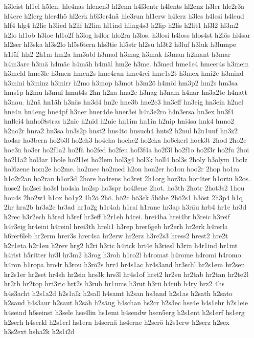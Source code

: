 {h3leist
hl1el
h5len.
hle4nas
hlenen3
hl2enn
h4l3entr
h4lents
hl2enz
h3ler
hle2r3a
hl4ere
h2lerg
hler4hö
hl2erk
h6l3er4nä
hle3run
hl1erw
h4lerz
h3les
h4lesi
h4leud
hlf4
hlg4
h2lie
h3lied
h2lif
h2lim
hl1ind
hling4s3
h2lip
h2lis
h2lit1
hl3l2
hl3m2
h2lo
hl1ob
h3loc
hl1o2f
h3log
h4lor
hlo2ra
h3los.
h3losi
h4loss
hlos4st
h2lös
hl4sar
hl2ser
hl3ska
hl3s2lo
hl5s6tern
hls3tie
hl5str
hl2su
hl3t2
h3luf
h3luk
h3lumpe
h1lüf
hlz2
2h1m
hm2a
hm3abl
h3mad
h3mag
h3mak
h3man
h2mant
h3mar
h4m3arc
h3mä
h4mäc
h4mäh
h4mäl
hm2e
h3me.
h3med
hme1e4
hmeer4s
h3mein
h3meld
hme3le
h3men
hmen2s
hme4ran
hme4rei
hme1s2t
h3mex
hmi2e
h3mind
h3mini
h3minz
h3mirr
h2mo
h3mop
h3mot
h3m2ö
h4möl
hm3p2
hm2s
hm3sa
hms1p
h2mu
h3mul
hmut4s
2hn
h2na
hna2c
h3nag
h3nam
h4nar
hn3a2te
h4natt
h3nau.
h2nä
hn1äh
h3näs
hn3d4
hn2e
hne3b
hne2e3
hn3eff
hn3eig
hn3ein
h2nel
hne4n
hn4eng
hne4pf
h3ner
hner4de
hner3ei
h4n3e2ro
h4n3ersa
hn3ex
hn3f4
hnflei4
hnhof8stras
h2nic
h2nid
h2nie
hn1im
hn1in
h2nip
hni4sa
hnk4
hnno2
h2no2r
hnra2
hn3sa
hn3s2p
hnst2
hns4to
hnsuch4
hnts2
h2nul
h2n1unf
hn3z2
ho4ar
ho3bern
ho2b3l
ho2ch3
ho4cha
hoche2
ho2cka
ho6ckerl
hock3t
2hod
2ho2e
hoe3n
ho3er
ho2f1a2
ho2fä
ho2fed
ho2feu
hof3f4a
ho2f3l
ho2f1o
ho2f3r
ho2fu
2hoi
ho2l1a2
hol3ar
1hole
ho2l1ei
ho2lem
hol3g4
hol3k
holl4
hol3s
2holy
h3olym
1holz
hol6zene
hom2e
ho2me.
ho2mec
ho2med
h2on
hon2er
ho1on
hoo2r
2hop
ho1ra
h1o2r2an
ho2rau
h1or3d
2hore
ho4rens
ho3ret
2h1org
hor3ta
hor4ter
h1ortu
h2os.
hose2
ho2sei
ho3sl
ho4sla
ho2sp
ho3spr
ho4ßene
2hot.
ho3th
2hotr
2hot3s2
1hou
hou4s
2ho2w1
h1ox
ho1y2
1h2ö
2hö.
hö2c
hö3ck
5höhe
2hö2s1
h3öst
2h3p4
h1q
2hr
hra2b
hr3a2c
hr3ad
hr1a2g
h1r4ah
h1rai
h1rane
hr3ap
h3räu
hrb4
hr1c
hr3d
h2rec
h3r2ech
h3red
h3ref
hr3eff
h2r1eh
h4rei.
hrei4ba
hrei4br
h3reic
h3reif
h4r3eig
hr4eini
h4reinl
hrei3th
hreli1
h3rep
hrer6geb
hr2erh
hr2erk
h4rerla
h6rer6leb
hr2erm
hrer3s
hrer4sa
hr2erw
hr2erz
h3re2s3
hress2
hrest2
hre2t
h2r1eta
h2r1eu
h2rev
hrg2
h2ri
h3ric
h4rick
hri4e
h3riesl
h3rin
h4r1ind
hr1int
h4rist
h5ritter
hr3l
hr3m2
h3rog
h3roh
h1ro2l
h4romat
h4rome
h4romi
h4romo
h4ron
h1ropa
hro4r
h3rou
h3rö2s
hrr4
hr4s1ac
hr4s3and
hr3schl
hr2s1em
hr2sen
hr2s1er
hr2set
hr4sh
hr2sin
hrs3k
hrs3l
hr4s1of
hrst2
hr2su
hr2tab
hr2tan
hr2te2l
hr2th
hr2top
hrt3ric
hrt2s
h3ruh
hr1ums
h3rut
h3rü
h4rüb
h4ry
hrz2
4hs
h4s3acht
h2s1a2d
h2s1alk
h2sall
h4samt
h2san
hs3and
h2s1as
h2sath
h2sato
h2saud
h4s3aur
h2saut
h2säh
h2säug
h4schan
hs2cr
h2s3ec
hse4e
h4s1ehr
h2s1eie
h4seind
h6seinst
h3sele
hse4lin
hs1emi
h4sendw
hsen5erg
h2s1ent
h2s1erf
hs1erg
h2serh
h4serkl
h2s1erl
hs1ern
h4sernä
hs4erne
h2serö
h2s1erw
h2serz
h2sex
h3s2ext
hsha2k
h2s1i2d
}
